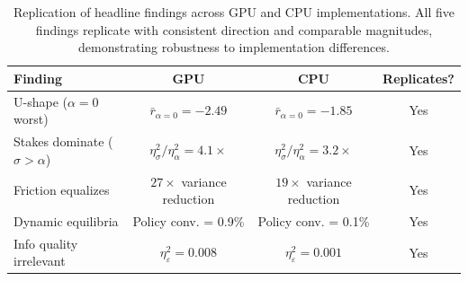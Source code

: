 \begin{table}[htbp]
\centering
\caption{Replication of headline findings across GPU and CPU implementations. All five findings replicate with consistent direction and comparable magnitudes, demonstrating robustness to implementation differences.}
\label{tab:findings-replication}
\begin{tabular}{p{4.5cm}|cc|c}
\toprule
Finding & GPU & CPU & Replicates? \\
\midrule
U-shape ($\alpha=0$ worst) & $\bar{r}_{\alpha=0}=-2.49$ & $\bar{r}_{\alpha=0}=-1.85$ & Yes \\
Stakes dominate ($\sigma > \alpha$) & $\eta^2_\sigma / \eta^2_\alpha = 4.1\times$ & $\eta^2_\sigma / \eta^2_\alpha = 3.2\times$ & Yes \\
Friction equalizes & $27\times$ variance reduction & $19\times$ variance reduction & Yes \\
Dynamic equilibria & Policy conv. = 0.9\% & Policy conv. = 0.1\% & Yes \\
Info quality irrelevant & $\eta^2_\varepsilon = 0.008$ & $\eta^2_\varepsilon = 0.001$ & Yes \\
\bottomrule
\end{tabular}
\end{table}